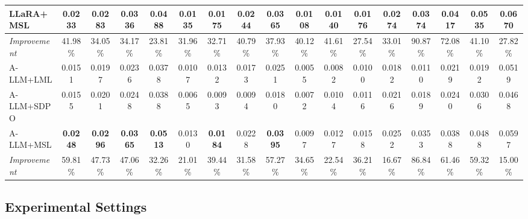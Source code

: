 \documentclass[sigconf,natbib=true]{acmart}
\begin{document}
\begin{table}[]
{\begin{tabular}{@{}l|cccc|cccc|cccc|cccc@{}}
\rowcolor[HTML]{C0F1FF} 
LLaRA+MSL                & 0.0233          & 0.0283          & 0.0336          & 0.0488          & \textbf{0.0135} & 0.0175          & \textbf{0.0244} & 0.0365          & \textbf{0.0108} & \textbf{0.0140} & \textbf{0.0176} & \textbf{0.0274} & 0.0374          & 0.0417          & 0.0535          & \textbf{0.0670} \\ \midrule
\rowcolor[HTML]{C0F1FF} 
\textit{Improvement}     & 41.98\%          & 34.05\%          & 34.17\%          & 23.81\%          & 31.96\%          & 32.71\%          & 40.79\%          & 37.93\%          & 40.12\%          & 41.61\%          & 27.54\%          & 33.01\%          & 90.87\%          & 72.08\%          & 41.10\%          & 27.82\%          \\ \midrule
A-LLM+LML                & 0.0151          & 0.0197          & 0.0236          & 0.0378          & 0.0107          & 0.0132          & 0.0173          & 0.0251          & 0.0055          & 0.0082          & 0.0100          & 0.0182          & 0.0110          & 0.0219          & 0.0192          & 0.0519          \\
A-LLM+SDPO               & 0.0155          & 0.0201          & 0.0248          & 0.0388          & 0.0065          & 0.0093          & 0.0094          & 0.0180          & 0.0072          & 0.0104          & 0.0116          & 0.0216          & 0.0189          & 0.0240          & 0.0306          & 0.0468          \\ \midrule
\rowcolor[HTML]{C0F1FF} 
A-LLM+MSL                & \textbf{0.0248} & \textbf{0.0296} & \textbf{0.0365} & \textbf{0.0513} & 0.0130          & \textbf{0.0184} & 0.0228          & \textbf{0.0395} & 0.0097          & 0.0127          & 0.0158          & 0.0252          & 0.0353          & 0.0388          & 0.0488          & 0.0597          \\ \midrule
\rowcolor[HTML]{C0F1FF} 
\textit{Improvement}     & 59.81\%          & 47.73\%          & 47.06\%          & 32.26\%          & 21.01\%          & 39.44\%          & 31.58\%          & 57.27\%          & 34.65\%          & 22.54\%          & 36.21\%          & 16.67\%          & 86.84\%          & 61.46\%          & 59.32\%          & 15.00\%          \\ \bottomrule
\end{tabular}%
}
\end{table}




\subsection{Experimental Settings}
\end{document}
